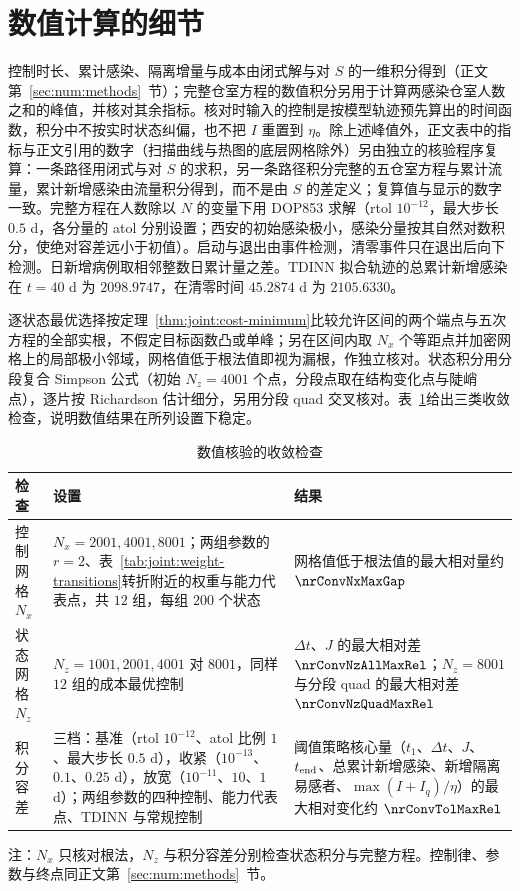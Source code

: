 \section{数值计算的细节}
\label{sec:sup:numerics}
控制时长、累计感染、隔离增量与成本由闭式解与对 $S$ 的一维积分得到（正文第~\ref{sec:num:methods}~节）；完整仓室方程的数值积分另用于计算两感染仓室人数之和的峰值，并核对其余指标。核对时输入的控制是按模型轨迹预先算出的时间函数，积分中不按实时状态纠偏，也不把 $I$ 重置到 $\eta$。除上述峰值外，正文表中的指标与正文引用的数字（扫描曲线与热图的底层网格除外）另由独立的核验程序复算：一条路径用闭式与对 $S$ 的求积，另一条路径积分完整的五仓室方程与累计流量，累计新增感染由流量积分得到，而不是由 $S$ 的差定义；复算值与显示的数字一致。完整方程在人数除以 $N$ 的变量下用 DOP853 求解（rtol $10^{-12}$，最大步长 $0.5$ d，各分量的 atol 分别设置；西安的初始感染极小，感染分量按其自然对数积分，使绝对容差远小于初值）。启动与退出由事件检测，清零事件只在退出后向下检测。日新增病例取相邻整数日累计量之差。TDINN 拟合轨迹的总累计新增感染在 $t=40$ d 为 $2098.9747$，在清零时间 $45.2874$ d 为 $2105.6330$。

逐状态最优选择按定理~\ref{thm:joint:cost-minimum}比较允许区间的两个端点与五次方程的全部实根，不假定目标函数凸或单峰；另在区间内取 $N_x$ 个等距点并加密网格上的局部极小邻域，网格值低于根法值即视为漏根，作独立核对。状态积分用分段复合 Simpson 公式（初始 $N_z=4001$ 个点，分段点取在结构变化点与陡峭点），逐片按 Richardson 估计细分，另用分段 quad 交叉核对。表~\ref{tab:sup:convergence}给出三类收敛检查，说明数值结果在所列设置下稳定。
\begin{table}[htbp]
\centering\small
\renewcommand{\arraystretch}{1.2}
\begin{threeparttable}
\caption{数值核验的收敛检查}
\label{tab:sup:convergence}
\begin{tabularx}{\linewidth}{@{}l>{\raggedright\arraybackslash}X>{\raggedright\arraybackslash}X@{}}
\toprule
检查 & 设置 & 结果\\
\midrule
控制网格 $N_x$ & $N_x=2001,4001,8001$；两组参数的 $r=2$、表~\ref{tab:joint:weight-transitions}转折附近的权重与能力代表点，共 $12$ 组，每组 $200$ 个状态 & 网格值低于根法值的最大相对量约 $\nrConvNxMaxGap$\\
状态网格 $N_z$ & $N_z=1001,2001,4001$ 对 $8001$，同样 $12$ 组的成本最优控制 & $\Delta t$、$J$ 的最大相对差 $\nrConvNzAllMaxRel$；$N_z=8001$ 与分段 quad 的最大相对差 $\nrConvNzQuadMaxRel$\\
积分容差 & 三档：基准（rtol $10^{-12}$、atol 比例 $1$、最大步长 $0.5$ d），收紧（$10^{-13}$、$0.1$、$0.25$ d），放宽（$10^{-11}$、$10$、$1$ d）；两组参数的四种控制、能力代表点、TDINN 与常规控制 & 阈值策略核心量（$t_1$、$\Delta t$、$J$、$t_{\rm end}$、总累计新增感染、新增隔离易感者、$\max(I+I_q)/\eta$）的最大相对变化约 $\nrConvTolMaxRel$\\
\bottomrule
\end{tabularx}
\begin{tablenotes}[flushleft]\footnotesize
\item 注：$N_x$ 只核对根法，$N_z$ 与积分容差分别检查状态积分与完整方程。控制律、参数与终点同正文第~\ref{sec:num:methods}~节。
\end{tablenotes}
\end{threeparttable}
\end{table}

